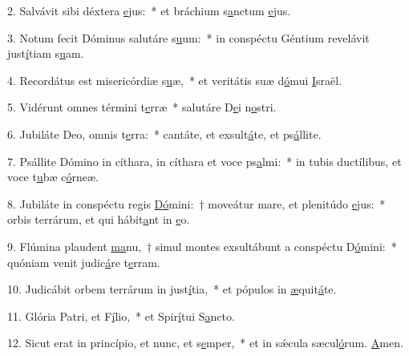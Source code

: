 2. Salvávit sibi déxtera \uline{e}jus:~* et bráchium s\uline{a}nctum \uline{e}jus.\par 
3. Notum fecit Dóminus salutáre s\uline{u}um:~* in conspéctu Géntium revelávit just\uline{í}tiam s\uline{u}am.\par 
4. Recordátus est misericórdiæ s\uline{u}æ,~* et veritátis suæ d\uline{ó}mui \uline{I}sraël.\par 
5. Vidérunt omnes términi t\uline{e}rræ~* salutáre D\uline{e}i n\uline{o}stri.\par 
6. Jubiláte Deo, omnis t\uline{e}rra:~* cantáte, et exsult\uline{á}te, et ps\uline{á}llite.\par 
7. Psállite Dómino in cíthara, in cíthara et voce ps\uline{a}lmi:~* in tubis ductílibus, et voce t\uline{u}bæ c\uline{ó}rneæ.\par 
8. Jubiláte in conspéctu regis \uline{Dó}mini:~† moveátur mare, et plenitúdo \uline{e}jus:~* orbis terrárum, et qui hábit\uline{a}nt in \uline{e}o.\par 
9. Flúmina plaudent \uline{ma}nu,~† simul montes exsultábunt a conspéctu D\uline{ó}mini:~* quóniam venit judic\uline{á}re t\uline{e}rram.\par 
10. Judicábit orbem terrárum in just\uline{í}tia,~* et pópulos in \uline{æ}quit\uline{á}te.\par 
11. Glória Patri, et F\uline{í}lio,~* et Spir\uline{í}tui S\uline{a}ncto.\par 
12. Sicut erat in princípio, et nunc, et s\uline{e}mper,~* et in sǽcula sæcul\uline{ó}rum. \uline{A}men.\par 
